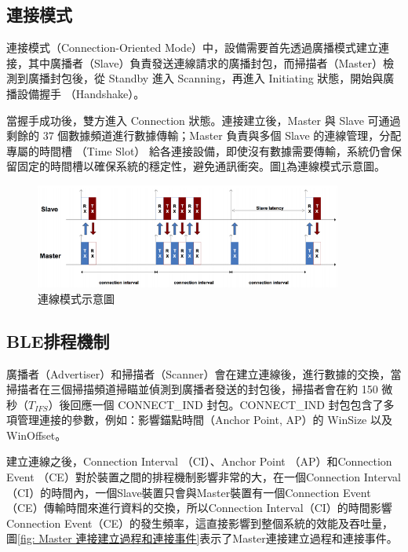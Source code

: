 \begin{ZhChapter}
\subsection{連接模式}

連接模式（Connection-Oriented Mode）中，設備需要首先透過廣播模式建立連接，其中廣播者（Slave）負責發送連線請求的廣播封包，而掃描者（Master）檢測到廣播封包後，從 Standby 進入 Scanning，再進入 Initiating 狀態，開始與廣播設備握手 （Handshake）。

當握手成功後，雙方進入 Connection 狀態。連接建立後，Master 與 Slave 可通過剩餘的 37 個數據頻道進行數據傳輸；Master 負責與多個 Slave 的連線管理，分配專屬的時間槽 （Time Slot） 給各連接設備，即使沒有數據需要傳輸，系統仍會保留固定的時間槽以確保系統的穩定性，避免通訊衝突。圖\ref{fig: 連線模式示意圖}為連線模式示意圖。

\begin{figure}[H]
    \centering
    \includegraphics[width = 0.9\textwidth]{image/連線模式示意圖.png}
    \caption{連線模式示意圖\cite{9035389}}
    \label{fig: 連線模式示意圖}
\end{figure}

\subsection{BLE排程機制}

廣播者（Advertiser）和掃描者（Scanner）會在建立連線後，進行數據的交換，當掃描者在三個掃描頻道掃瞄並偵測到廣播者發送的封包後，掃描者會在約 150 微秒（$T_{IFS}$）後回應一個 CONNECT\_IND 封包。CONNECT\_IND 封包包含了多項管理連接的參數，例如：影響錨點時間（Anchor Point, AP）的 WinSize 以及 WinOffset。

建立連線之後，Connection Interval （CI）、Anchor Point （AP）和Connection Event （CE）對於裝置之間的排程機制影響非常的大，在一個Connection Interval（CI）的時間內，一個Slave裝置只會與Master裝置有一個Connection Event（CE）傳輸時間來進行資料的交換，所以Connection Interval（CI）的時間影響Connection Event（CE）的發生頻率，這直接影響到整個系統的效能及吞吐量，圖\ref{fig: Master 連接建立過程和連接事件}表示了Master連接建立過程和連接事件。  


\end{ZhChapter}
